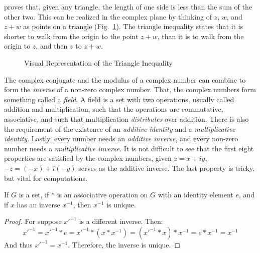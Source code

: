    proves that, given any triangle, the length of one side is less
    than the sum of the other two. This can be realized in the
    complex plane by thinking of $z$, $w$, and $z+w$ as points on a
    triangle (Fig.~\ref{fig:Triangle_Inequality}). The triangle inequality
    states that it is shorter to walk from the origin to the point $z+w$,
    than it is to walk from the origin to $z$, and then $z$ to $z+w$.
    \begin{figure}[H]
        \centering
        \captionsetup{type=figure}
        
        \caption{Visual Representation of the Triangle Inequality}
        \label{fig:Triangle_Inequality}
    \end{figure}
    The complex conjugate and the modulus of a complex number can
    combine to form the \textit{inverse} of a non-zero complex number.
    That, the complex numbers form something called a \textit{field}. A
    field is a set with two operations, usually called addition
    and multiplication, such that the operations are commutative,
    associative, and such that multiplication \textit{distributes}
    over addition. There is also the requirement of the existence of an
    \textit{additive identity} and a \textit{multiplicative identity}.
    Lastly, every number needs an \textit{additive inverse}, and every
    non-zero number needs a \textit{multiplicative inverse}. It is not
    difficult to see that the first eight properties are satisfied by
    the complex numbers, given $z=x+iy$,
    $\minus{z}=(\minus{x})+i(\minus{y})$ serves as the additive inverse.
    The last property is tricky, but vital for computations.
    \begin{theorem}
        \label{thm:Inverses_Are_Unique_In_Group}%
        If $G$ is a set, if $*$ is an associative operation on $G$ with an
        identity element $e$, and if $x$ has an inverse $x^{\minus{1}}$,
        then $x^{\minus{1}}$ is unique.
    \end{theorem}
    \begin{proof}
        For suppose $x'^{\minus{1}}$ is a different inverse. Then:
        \begin{equation}
            x'^{\minus{1}}=x'^{\minus{1}}*e
                          =x'^{\minus{1}}*(x*x^{\minus{1}})
                          =(x'^{\minus{1}}*x)*x^{\minus{1}}
                          =e*x^{\minus{1}}
                          =x^{\minus{1}}
        \end{equation}
        And thus $x'^{\minus{1}}=x^{\minus{1}}$. Therefore,
        the inverse is unique.
    \end{proof}
